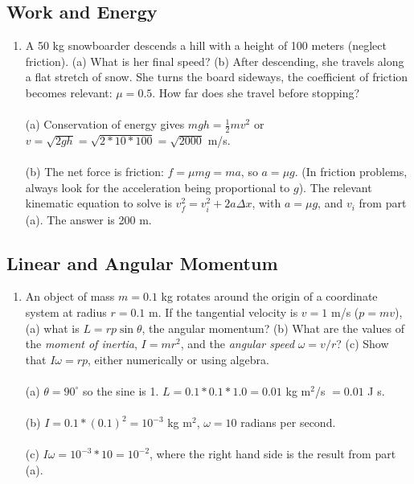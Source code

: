 \documentclass[10pt]{article}
\begin{document}
\subsection{Work and Energy}
\begin{enumerate}
\item A 50 kg snowboarder descends a hill with a height of 100 meters (neglect friction).  (a) What is her final speed?  (b) After descending, she travels along a flat stretch of snow.  She turns the board sideways, the coefficient of friction becomes relevant: $\mu = 0.5$.  How far does she travel before stopping? \\ \\
(a) Conservation of energy gives $mgh = \frac{1}{2}mv^2$ or $v = \sqrt{2gh} = \sqrt{2*10*100} = \sqrt{2000}$ m/s. \\ \\
(b) The net force is friction: $f = \mu m g = m a$, so $a = \mu g$.  (In friction problems, always look for the acceleration being proportional to $g$).  The relevant kinematic equation to solve is $v_f^2 = v_i^2 + 2a\Delta x$, with $a = \mu g$, and $v_i$ from part (a).  The answer is 200 m. 
\end{enumerate}
\subsection{Linear and Angular Momentum}
\begin{enumerate}
\item An object of mass $m = 0.1$ kg rotates around the origin of a coordinate system at radius $r = 0.1$ m.  If the tangential velocity is $v = 1$ m/s ($p = mv$), (a) what is $L = rp\sin\theta$, the angular momentum?  (b) What are the values of the \textit{moment of inertia}, $I = mr^2$, and the \textit{angular speed} $\omega = v/r$?  (c) Show that $I\omega = rp$, either numerically or using algebra. \\ \\
(a) $\theta = 90^{\circ}$ so the sine is 1.  $L = 0.1 * 0.1 * 1.0 = 0.01$ kg m$^2$/s $= 0.01$ J s. \\ \\
(b) $I = 0.1*(0.1)^2 = 10^{-3}$ kg m$^2$, $\omega = 10$ radians per second. \\ \\
(c) $I\omega = 10^{-3} * 10 = 10^{-2}$, where the right hand side is the result from part (a).
\end{enumerate}
\end{document}
